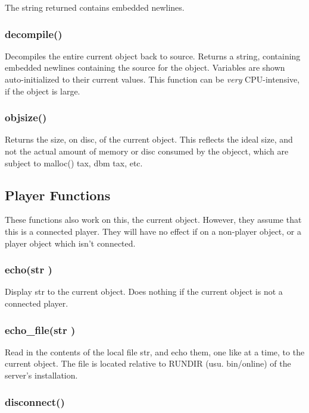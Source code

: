 The string returned contains embedded newlines.

\subsubsection{\func decompile()}

Decompiles the entire current object back to source.  Returns a
string, containing embedded newlines containing the source for the
object.  Variables are shown auto-initialized to their current values.
This function can be {\em very} CPU-intensive, if the object is large.

\subsubsection{\func objsize()}

Returns the size, on disc, of the current object.  This reflects the
ideal size, and not the actual amount of memory or disc consumed by
the objecct, which are subject to {\keyword malloc()} tax, dbm tax, etc.

\subsection{Player Functions}

These functions also work on {\keyword this}, the current object.  However, they
assume that {\keyword this} is a connected player.  They will have no effect
if on a non-player object, or a player object which isn't connected.

\subsubsection{\func echo({\funcarg str })}

Display {\funcarg str } to the current object.  Does nothing if the
current object is not a connected player.

\subsubsection{\func echo\_file({\funcarg str })}

Read in the contents of the local file {\funcarg str}, and echo them,
one like at a time, to the current object.  The file is located
relative to RUNDIR (usu. bin/online) of the server's installation.

\subsubsection{\func disconnect()}

